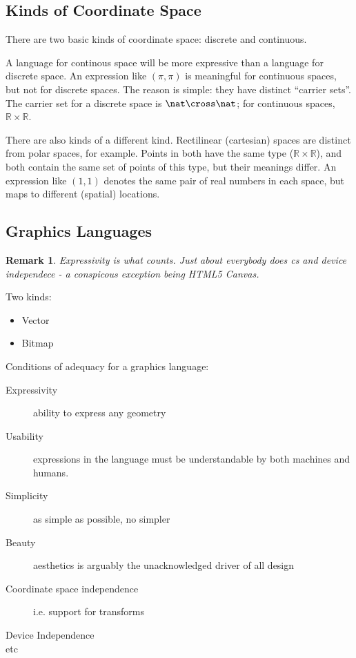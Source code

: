 \documentclass[reqno,12pt]{tufte-handout}
\numberwithin{equation}{subsection}
\numberwithin{equation}{subsection}
\newtheorem{remark}{Remark}
\newcommand\cspace{coordinate space}
\newcommand\CSpace{Coordinate Space}
\newcommand\RR{\(\mathds{R}\times\mathds{R}\)}
\begin{document}
\subsection{Kinds of \CSpace}
\label{subs:cskinds}

There are two basic kinds of \cspace: discrete and continuous.

A language for continous space will be more expressive than a language
for discrete space.  An expression like \((\pi,\pi)\) is meaningful
for continuous spaces, but not for discrete spaces.  The reason is
simple: they have distinct ``carrier sets''.  The carrier set for a
discrete space is \(\nat\cross\nat\); for continuous spaces, \RR{}.

There are also kinds of a different kind.  Rectilinear (cartesian)
spaces are distinct from polar spaces, for example.  Points in both
have the same type (\RR), and both contain the same set of points of
this type, but their meanings differ.  An expression like \((1,1)\)
denotes the same pair of real numbers in each space, but maps to
different (spatial) locations.

\subsection{Graphics Languages}
\label{subs:reqts}

\begin{remark}
  Expressivity is what counts.  Just about everybody does cs and
  device independece - a conspicous exception being HTML5 Canvas.
\end{remark}

Two kinds:

\begin{itemize}
\item Vector
\item Bitmap
\end{itemize}

Conditions of adequacy for a graphics language:

\begin{description}
\item [Expressivity] ability to express any geometry
\item [Usability] expressions in the language must be understandable
  by both machines and humans.
\item [Simplicity] as simple as possible, no simpler
\item [Beauty] aesthetics is arguably the unacknowledged driver of
  all design
\item [Coordinate space independence] i.e. support for transforms
\item [Device Independence]
\item [etc]
\end{description}
\end{document}

